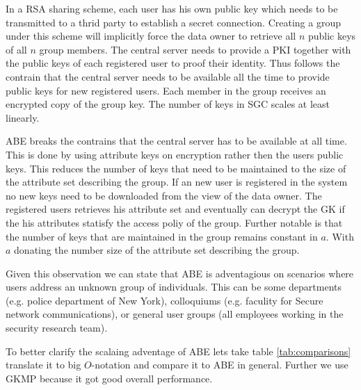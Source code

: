 In a \ac{RSA} sharing scheme, each user has his own public key which needs to be transmitted to a thrid party to establish a secret connection. Creating a group under this scheme will implicitly force the data owner to retrieve all $n$ public keys of all $n$ group members. The central server needs to provide a \ac{PKI} together with the public keys of each registered user to proof their identity. Thus follows the contrain that the central server needs to be available all the time to provide public keys for new registered users. Each member in the group receives an encrypted copy of the group key. The number of keys in \ac{SGC} scales at least linearly. 

\ac{ABE} breaks the contrains that the central server has to be available at all time. This is done by using attribute keys on encryption rather then the users public keys. This reduces the number of keys that need to be maintained to the size of the attribute set describing the group. If an new user is registered in the system no new keys need to be downloaded from the view of the data owner. The registered users retrieves his attribute set and eventually can decrypt the \ac{GK} if the his attributes statisfy the access poliy of the group. Further notable is that the number of keys that are maintained in the group remains constant in $a$. With $a$ donating the number size of the attribute set describing the group. 

Given this observation we can state that \ac{ABE} is adventagious on scenarios where users address an unknown group of individuals. This can be some departments (e.g. police department of New York), colloquiums (e.g. faculity for Secure network communications), or general user groups (all employees working in the security research team).

To better clarify the scalaing adventage of \ac{ABE} lets take table \ref{tab:comparisons} translate it to big $O$-notation and compare it to \ac{ABE} in general. Further we use \ac{GKMP} because it got good overall performance.

